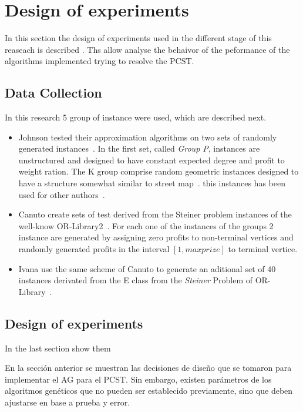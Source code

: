 \documentclass[10pt, conference, compsocconf]{IEEEtran}
\begin{document}
\section{Design of experiments}
\label{sec:designexp}

In this section the design of experiments used in the different stage of this reaseach is described . Ths allow analyse the behaivor of the peformance of the algorithms implemented trying to resolve the PCST. 


 \subsection{Data Collection}
\label{sec:instancias}
In this research 5 group of instance were used, which are described next.

\begin{itemize}
 \item Johnson tested their approximation algorithms on two sets of randomly generated instances~\cite{338637}. In the first set, called {\em Group P}, instances are unstructured and designed to have constant expected degree and profit to weight ration. The K group comprise random geometric instances designed to have a structure somewhat similar to street map~\cite{minkoff}. this instances has been used for other authors~\cite{1017391, Canuto01localsearch}.

 \item Canuto create sets of test derived from the Steiner problem instances of the well-know OR-Library2~\cite{Canuto01localsearch}. For each one of the instances of the groups 2 instance are generated by assigning zero profits to non-terminal vertices and randomly generated profits in the interval  $[1, maxprize]$ to terminal vertice. 

 \item Ivana use the same scheme of Canuto to generate an aditional set of 40 instances derivated from the E class from the {\em Steiner} Problem of OR-Library~\cite{ivana}. 
\end{itemize}


  \subsection{Design of experiments}
    In the last section show them 
  
  En la sección anterior se muestran las decisiones de diseño que se tomaron para implementar el AG para el PCST. Sin embargo, existen parámetros de los algoritmos genéticos que no pueden ser establecido previamente, sino que deben ajustarse en base a prueba y error. 
\end{document}
